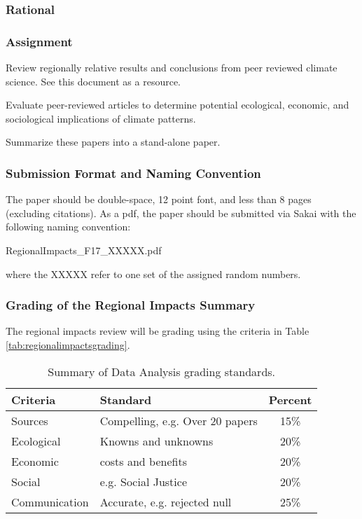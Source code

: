 
\subsubsection{Rational}

\subsubsection{Assignment}

Review regionally relative results and conclusions from peer reviewed climate science. See this document as a resource.

Evaluate peer-reviewed articles to determine potential ecological, economic, and sociological implications of climate patterns.

Summarize these papers into a stand-alone paper. 

\subsubsection{Submission Format and Naming Convention}

The paper should be double-space, 12 point font, and less than 8 pages (excluding citations). As a pdf, the paper should be submitted via Sakai with the following naming convention:

RegionalImpacts\_F17\_XXXXX.pdf

where the XXXXX refer to one set of the assigned random numbers. 

\subsubsection{Grading of the Regional Impacts Summary}

The regional impacts review will be grading using the criteria in Table \ref{tab:regionalimpactsgrading}.

\begin{table}[h]
\caption{Summary of Data Analysis grading standards.}
\label{tab:datagrading}
\begin{tabular}{llc}\hline
Criteria            &   Standard    & Percent \\ \hline\hline
Sources     & Compelling, e.g. Over 20 papers & 15\% \\
Ecological  & Knowns and unknowns             & 20\% \\
Economic    & costs and benefits              & 20\% \\
Social      & e.g. Social Justice             & 20\% \\
Communication    & Accurate, e.g. rejected null   & 25\% \\

\hline
\end{tabular}
\end{table}